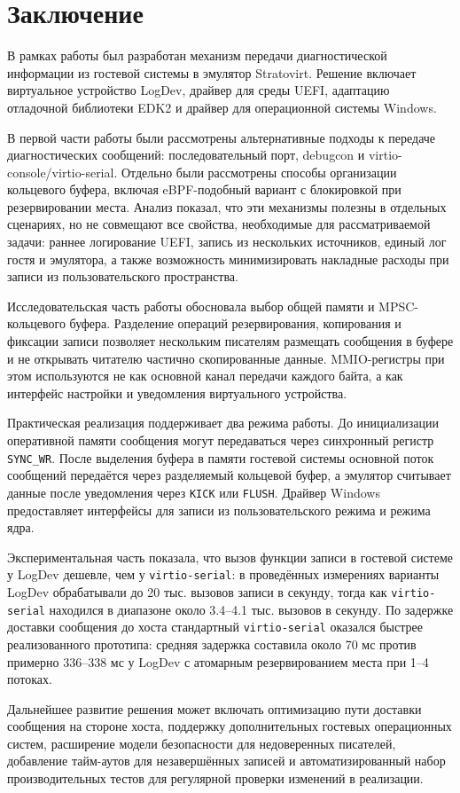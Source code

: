 \section{Заключение}
\label{sec:Chapter6} 

В рамках работы был разработан механизм передачи диагностической информации из
гостевой системы в эмулятор Stratovirt. Решение включает виртуальное устройство
LogDev, драйвер для среды UEFI, адаптацию отладочной библиотеки EDK2 и драйвер
для операционной системы Windows.

В первой части работы были рассмотрены альтернативные подходы к передаче
диагностических сообщений: последовательный порт, debugcon и
virtio-console/virtio-serial. Отдельно были рассмотрены способы организации
кольцевого буфера, включая eBPF-подобный вариант с блокировкой при
резервировании места. Анализ показал, что эти механизмы полезны в отдельных
сценариях, но не совмещают все свойства, необходимые для рассматриваемой задачи:
раннее логирование UEFI, запись из нескольких источников, единый лог гостя и
эмулятора, а также возможность минимизировать накладные расходы при записи из
пользовательского пространства.

Исследовательская часть работы обосновала выбор общей памяти и
MPSC-кольцевого буфера. Разделение операций резервирования, копирования и
фиксации записи позволяет нескольким писателям размещать сообщения в буфере и
не открывать читателю частично скопированные данные. MMIO-регистры при этом
используются не как основной канал передачи каждого байта, а как интерфейс
настройки и уведомления виртуального устройства.

Практическая реализация поддерживает два режима работы. До инициализации
оперативной памяти сообщения могут передаваться через синхронный регистр
\texttt{SYNC\_WR}. После выделения буфера в памяти гостевой системы основной
поток сообщений передаётся через разделяемый кольцевой буфер, а эмулятор
считывает данные после уведомления через \texttt{KICK} или \texttt{FLUSH}.
Драйвер Windows предоставляет интерфейсы для записи из пользовательского режима
и режима ядра.

Экспериментальная часть показала, что вызов функции записи в гостевой системе у
LogDev дешевле, чем у \texttt{virtio-serial}: в проведённых измерениях варианты
LogDev обрабатывали до 20 тыс. вызовов записи в секунду, тогда как
\texttt{virtio-serial} находился в диапазоне около 3.4--4.1 тыс. вызовов в
секунду. По задержке доставки сообщения до хоста стандартный
\texttt{virtio-serial} оказался быстрее реализованного прототипа: средняя
задержка составила около 70 мс против примерно 336--338 мс у LogDev с
атомарным резервированием места при 1--4 потоках.

Дальнейшее развитие решения может включать оптимизацию пути доставки сообщения
на стороне хоста, поддержку дополнительных гостевых операционных систем,
расширение модели безопасности для недоверенных писателей, добавление
тайм-аутов для незавершённых записей и автоматизированный набор
производительных тестов для регулярной проверки изменений в реализации.

